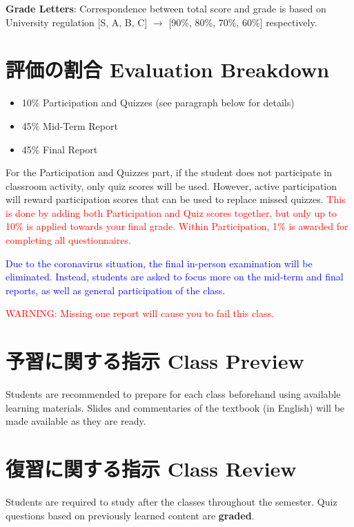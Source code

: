 \documentclass{article}
\begin{document}
\smallskip\noindent
\textbf{Grade Letters}: Correspondence between total score and grade is based on University regulation [S, A, B, C] $\rightarrow$ [90\%, 80\%, 70\%, 60\%] respectively.

\section{評価の割合 Evaluation Breakdown}
\begin{itemize}
    \item 10\% Participation and Quizzes (see paragraph below for details)
   	\item 45\% Mid-Term Report
   	\item 45\% Final Report
\end{itemize}

For the Participation and Quizzes part, if the student does not participate in classroom activity, only quiz scores will be used. However, active participation will reward participation scores that can be used to replace missed quizzes. \textcolor{red}{This is done by adding both Participation and Quiz scores together, but only up to 10\% is applied towards your final grade. Within Participation, 1\% is awarded for completing all questionnaires.}

\textcolor{blue}{Due to the coronavirus situation, the final in-person examination will be eliminated. Instead, students are asked to focus more on the mid-term and final reports, as well as general participation of the class.}

\textcolor{red}{WARNING: Missing one report will cause you to fail this class.}

\section{予習に関する指示 Class Preview}
Students are recommended to prepare for each class beforehand using available learning materials. Slides and commentaries of the textbook (in English) will be made available as they are ready.

\section{復習に関する指示 Class Review}
Students are required to study after the classes throughout the semester. Quiz questions based on previously learned content are \textbf{graded}.
\end{document}
